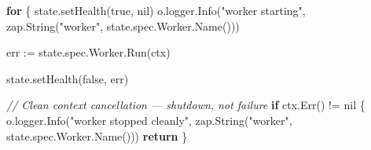 \documentclass[
]{article}
\newenvironment{Shaded}{}{}
\newcommand{\CommentTok}[1]{\textcolor[rgb]{0.38,0.63,0.69}{\textit{#1}}}
\newcommand{\ControlFlowTok}[1]{\textcolor[rgb]{0.00,0.44,0.13}{\textbf{#1}}}
\newcommand{\NormalTok}[1]{#1}
\newcommand{\OperatorTok}[1]{\textcolor[rgb]{0.40,0.40,0.40}{#1}}
\newcommand{\OtherTok}[1]{\textcolor[rgb]{0.00,0.44,0.13}{#1}}
\newcommand{\StringTok}[1]{\textcolor[rgb]{0.25,0.44,0.63}{#1}}
\begin{document}
\begin{Shaded}
\begin{Highlighting}[]
    \ControlFlowTok{for} \OperatorTok{\{}
\NormalTok{        state}\OperatorTok{.}\NormalTok{setHealth}\OperatorTok{(}\OtherTok{true}\OperatorTok{,} \OtherTok{nil}\OperatorTok{)}
\NormalTok{        o}\OperatorTok{.}\NormalTok{logger}\OperatorTok{.}\NormalTok{Info}\OperatorTok{(}\StringTok{"worker starting"}\OperatorTok{,}\NormalTok{ zap}\OperatorTok{.}\NormalTok{String}\OperatorTok{(}\StringTok{"worker"}\OperatorTok{,}\NormalTok{ state}\OperatorTok{.}\NormalTok{spec}\OperatorTok{.}\NormalTok{Worker}\OperatorTok{.}\NormalTok{Name}\OperatorTok{()))}

\NormalTok{        err }\OperatorTok{:=}\NormalTok{ state}\OperatorTok{.}\NormalTok{spec}\OperatorTok{.}\NormalTok{Worker}\OperatorTok{.}\NormalTok{Run}\OperatorTok{(}\NormalTok{ctx}\OperatorTok{)}

\NormalTok{        state}\OperatorTok{.}\NormalTok{setHealth}\OperatorTok{(}\OtherTok{false}\OperatorTok{,}\NormalTok{ err}\OperatorTok{)}

        \CommentTok{// Clean context cancellation — shutdown, not failure}
        \ControlFlowTok{if}\NormalTok{ ctx}\OperatorTok{.}\NormalTok{Err}\OperatorTok{()} \OperatorTok{!=} \OtherTok{nil} \OperatorTok{\{}
\NormalTok{            o}\OperatorTok{.}\NormalTok{logger}\OperatorTok{.}\NormalTok{Info}\OperatorTok{(}\StringTok{"worker stopped cleanly"}\OperatorTok{,}\NormalTok{ zap}\OperatorTok{.}\NormalTok{String}\OperatorTok{(}\StringTok{"worker"}\OperatorTok{,}\NormalTok{ state}\OperatorTok{.}\NormalTok{spec}\OperatorTok{.}\NormalTok{Worker}\OperatorTok{.}\NormalTok{Name}\OperatorTok{()))}
            \ControlFlowTok{return}
        \OperatorTok{\}}


\end{Highlighting}
\end{Shaded}
\end{document}
